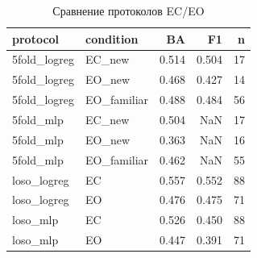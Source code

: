 \begin{table}
\caption{Сравнение протоколов EC/EO}
\label{tab:compare}
\begin{tabular}{llrrr}
\toprule
protocol & condition & BA & F1 & n \\
\midrule
5fold_logreg & EC_new & 0.514 & 0.504 & 17 \\
5fold_logreg & EO_new & 0.468 & 0.427 & 14 \\
5fold_logreg & EO_familiar & 0.488 & 0.484 & 56 \\
5fold_mlp & EC_new & 0.504 & NaN & 17 \\
5fold_mlp & EO_new & 0.363 & NaN & 16 \\
5fold_mlp & EO_familiar & 0.462 & NaN & 55 \\
loso_logreg & EC & 0.557 & 0.552 & 88 \\
loso_logreg & EO & 0.476 & 0.475 & 71 \\
loso_mlp & EC & 0.526 & 0.450 & 88 \\
loso_mlp & EO & 0.447 & 0.391 & 71 \\
\bottomrule
\end{tabular}
\end{table}
